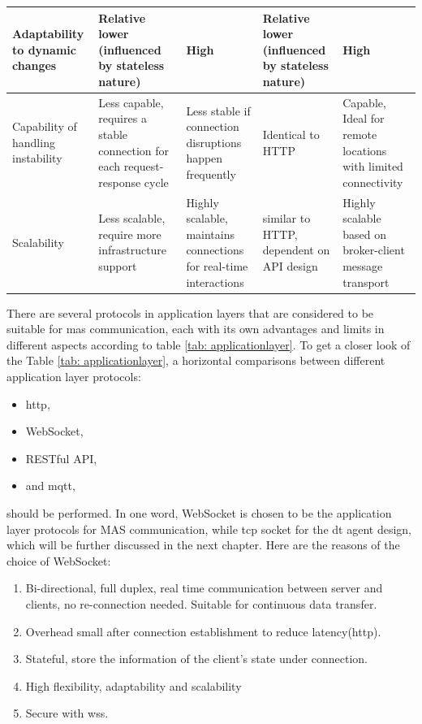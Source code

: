 \begin{table}
\begin{tabular}{|m{}|m{}|m{}|m{}|m{}|}
    Adaptability to dynamic changes & Relative lower (influenced by stateless nature) & High & Relative lower (influenced by stateless nature) & High \\ \hline
    Capability of handling instability & Less capable, requires a stable connection for each request-response cycle & Less stable if connection disruptions happen frequently & Identical to HTTP & Capable, Ideal for remote locations with limited connectivity \\ \hline
    Scalability & Less scalable, require more infrastructure support & Highly scalable, maintains connections for real-time interactions & similar to HTTP, dependent on API design & Highly scalable based on broker-client message transport \\ \hline
    \end{tabular}
\end{table}

There are several protocols in application layers that are considered to be suitable for \gls{mas} communication, each with its own advantages and limits in different aspects according to table \ref{tab: applicationlayer}.
To get a closer look of the Table \ref{tab: applicationlayer},  a horizontal comparisons between different application layer protocols: 

\begin{itemize}
\item \gls{http},
\item WebSocket,
\item RESTful API,
\item and \gls{mqtt},
\end{itemize}
should be performed. In one word, WebSocket is chosen to be the application layer protocols for MAS communication, while \gls{tcp} socket for the \gls{dt} agent design, which will be further discussed in the next chapter. Here are the reasons of the choice of WebSocket: 
\begin{enumerate}
\item Bi-directional, full duplex, real time communication between server and clients, no re-connection needed. Suitable for continuous data transfer.
\item Overhead small after connection establishment to reduce latency(\gls{http}).
\item Stateful, store the information of the client's state under connection.
\item High flexibility, adaptability and scalability
\item Secure with wss.
\end{enumerate}


